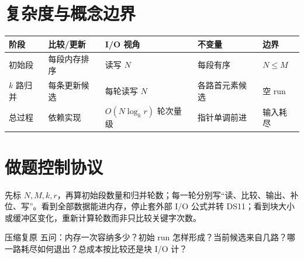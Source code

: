 \documentclass[UTF8,fontset=none,11pt,a4paper]{ctexart}
\begin{document}
\section{复杂度与概念边界}
\begin{center}\small
\begin{tabularx}{\linewidth}{L{2.8cm}C{1.8cm}C{1.8cm}YY}\toprule
阶段 & 比较/更新 & I/O 视角 & 不变量 & 边界\\\midrule
初始段 & 每段内存排序 & 读写 $N$ & 每段有序 & $N\le M$\\
$k$ 路归并 & 每条更新候选 & 每轮读写 $N$ & 各路首元素候选 & 空 run\\
总过程 & 依赖实现 & $O(N\log_k r)$ 轮次量级 & 指针单调前进 & 输入耗尽\\\bottomrule\end{tabularx}\end{center}

\section{做题控制协议}
先标 $N,M,k,r$，再算初始段数量和归并轮数；每一轮分别写“读、比较、输出、补位、写”。看到全部数据能进内存，停止套外部 I/O 公式并转 DS11；看到块大小或缓冲区变化，重新计算轮数而非只比较关键字次数。
\begin{corebox}{压缩复原}
五问：内存一次容纳多少？初始 run 怎样形成？当前候选来自几路？哪一路耗尽如何退出？总成本按比较还是块 I/O 计？
\end{corebox}
\end{document}
